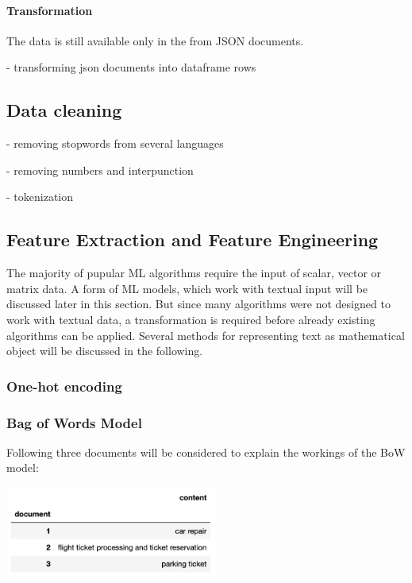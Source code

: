         \paragraph{Transformation}
        The data is still available only in the from \ac{JSON} documents.
        
        - transforming json documents into dataframe rows
        
        
        \subsection{Data cleaning}
        - removing stopwords from several languages
        
        - removing numbers and interpunction
        
        - tokenization
        
        \subsection{Feature Extraction and Feature Engineering}
        The majority of pupular ML algorithms require the input of scalar, vector or matrix data. A form of ML models, which work with textual input will be discussed later in this section. 
        But since many algorithms were not designed to work with textual data, a transformation is required before already existing algorithms can be applied. Several methods for representing text as mathematical object will be discussed in the following.
    
            \subsubsection{One-hot encoding}
            
    
            \subsubsection{Bag of Words Model}
            Following three documents will be considered to explain the workings of the \ac{BoW} model:
    
            \includegraphics[height=3cm]{Bilder/corpus_bow.png}
            
